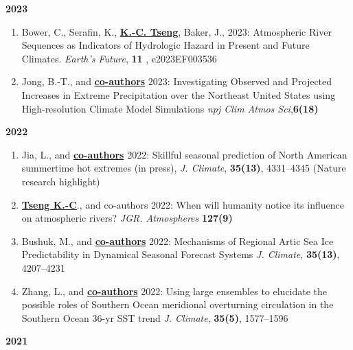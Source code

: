 \documentclass{article}
\begin{document}
\normalsize{\bf{2023}} 
\begin{enumerate}[resume] 
	
	\item Bower, C., Serafin, K., \normalsize{\bf{\underline{K.-C. Tseng}}}, Baker, J., 2023: Atmospheric River Sequences as Indicators of Hydrologic Hazard in Present and Future Climates. \textit{Earth's Future}, \normalsize{\bf{11}} , e2023EF003536 \par
	\item Jong, B.-T., and \normalsize{\bf{\underline{co-authors}}} 2023: Investigating Observed and Projected Increases in Extreme Precipitation over the Northeast United States using High-resolution Climate Model Simulations  \textit{npj Clim Atmos Sci},\normalsize{\bf{6(18)}} \par

\end{enumerate}	
\normalsize{\bf{2022}} 
\begin{enumerate}[resume]     
	\item Jia, L., and \normalsize{\bf{\underline{co-authors}}} 2022: Skillful seasonal prediction of North American summertime hot extremes (in press), \textit{J. Climate}, \normalsize{\bf{35(13)}}, 4331--4345 (Nature research highlight)
	\item \normalsize{\bf{\underline{Tseng K.-C}}}., and co-authors 2022: When will humanity notice its influence on atmospheric rivers? \textit{JGR. Atmospheres} \normalsize{\bf{127(9)}} 
	\item Bushuk, M., and \normalsize{\bf{\underline{co-authors}}} 2022: Mechanisms of Regional Artic Sea Ice Predictability in Dynamical Seasonal Forecast Systems \textit{J. Climate}, \normalsize{\bf{35(13)}}, 4207--4231
	\item Zhang, L., and \normalsize{\bf{\underline{co-authors}}} 2022: Using large ensembles to elucidate the possible roles of Southern Ocean meridional overturning circulation in the Southern Ocean 36-yr SST trend \textit{J. Climate}, \normalsize{\bf{35(5)}}, 1577--1596
\end{enumerate}
\normalsize{\bf{2021}} 
\end{document}
